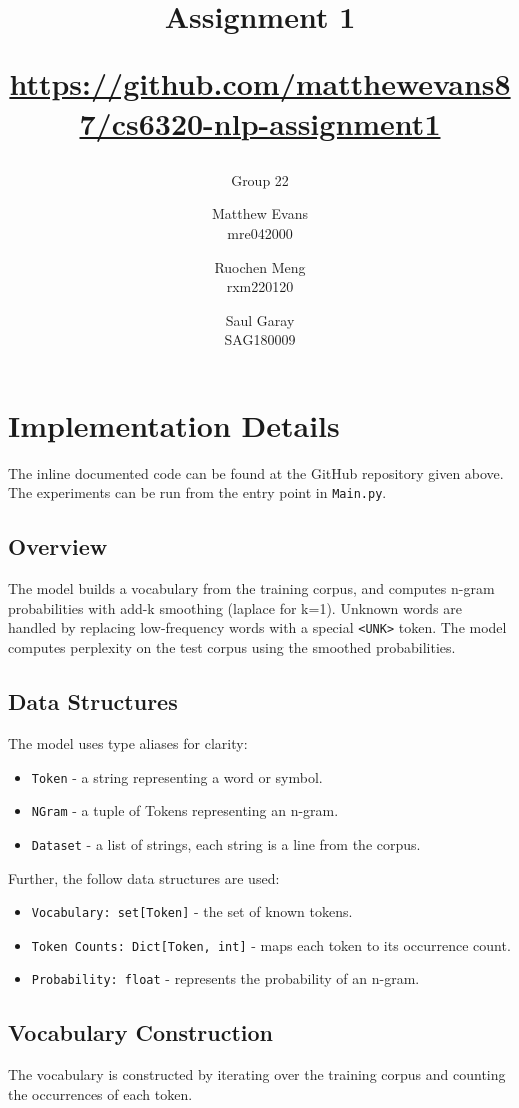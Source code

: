 \documentclass[a4paper]{article}
\title{Assignment 1 \\ \begin{small}\url{https://github.com/matthewevans87/cs6320-nlp-assignment1}\end{small}}
\author{Group 22 \and Matthew Evans \\ mre042000 \and Ruochen Meng \\ rxm220120 \and Saul Garay \\ SAG180009}
\date{}
\begin{document}
\maketitle

\section{Implementation Details}

The inline documented code can be found at the GitHub repository given above. The experiments can be run from the entry point in \texttt{Main.py}.

\subsection{Overview}
The model builds a vocabulary from the training corpus, and computes n-gram probabilities with add-k smoothing (laplace for k=1). Unknown words are handled by replacing low-frequency words with a special \texttt{<UNK>} token. The model computes perplexity on the test corpus using the smoothed probabilities.

\subsection{Data Structures}
The model uses type aliases for clarity:
\begin{itemize}
  \item \texttt{Token} - a string representing a word or symbol.
  \item \texttt{NGram} - a tuple of Tokens representing an n-gram.
  \item \texttt{Dataset} - a list of strings, each string is a line from the corpus.
\end{itemize}
Further, the follow data structures are used:
\begin{itemize}
  \item \texttt{Vocabulary: set[Token]} - the set of known tokens.
  \item \texttt{Token Counts: Dict[Token, int]} - maps each token to its occurrence count.
  \item \texttt{Probability: float} - represents the probability of an n-gram.
\end{itemize}

\subsection{Vocabulary Construction}
The vocabulary is constructed by iterating over the training corpus and counting the occurrences of each token.
\end{document}
